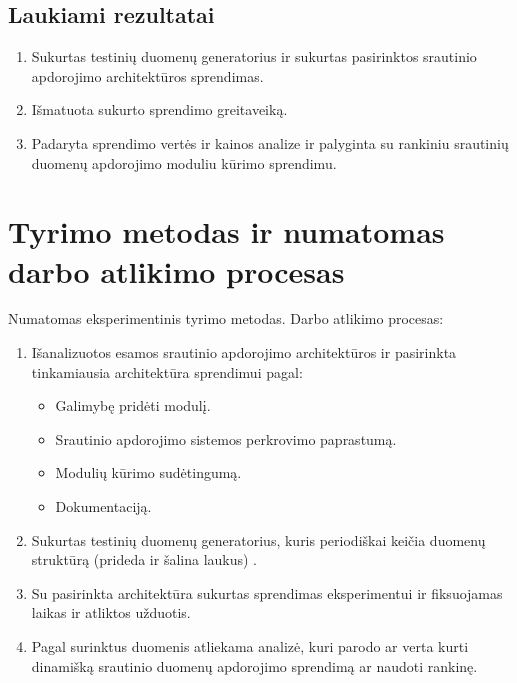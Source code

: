\documentclass{VUMIFPSbakalaurinis}
\begin{document}
\subsection{Laukiami rezultatai}
    \begin{enumerate}
        \item Sukurtas testinių duomenų generatorius ir sukurtas pasirinktos srautinio apdorojimo architektūros sprendimas.
        \item Išmatuota sukurto sprendimo greitaveiką.
        \item Padaryta sprendimo vertės ir kainos analize ir palyginta su rankiniu srautinių duomenų apdorojimo moduliu kūrimo sprendimu. 
    \end{enumerate}
    \vspace{1 mm}
\section{Tyrimo metodas ir numatomas darbo atlikimo procesas}
Numatomas eksperimentinis tyrimo metodas.
Darbo atlikimo procesas:
\begin{enumerate}
    \item Išanalizuotos esamos srautinio apdorojimo architektūros ir pasirinkta tinkamiausia architektūra sprendimui pagal:
    	\begin{itemize}
		\item Galimybę pridėti modulį.
		\item Srautinio apdorojimo sistemos perkrovimo paprastumą.
		\item Modulių kūrimo sudėtingumą.
		\item Dokumentaciją.
	\end{itemize}
    \item Sukurtas testinių duomenų generatorius, kuris periodiškai keičia duomenų struktūrą (prideda ir šalina laukus) .
    \item Su pasirinkta architektūra sukurtas sprendimas eksperimentui ir fiksuojamas laikas ir atliktos užduotis.
    \item Pagal surinktus duomenis atliekama analizė, kuri parodo ar verta kurti dinamišką srautinio duomenų apdorojimo sprendimą 
    ar naudoti rankinę.  
\end{enumerate}
\end{document}
